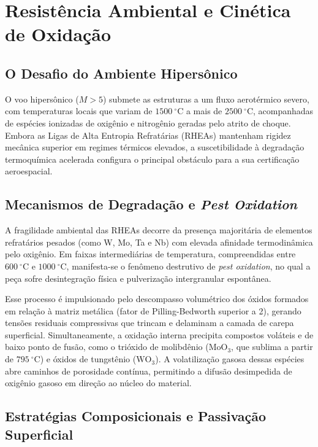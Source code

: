 \section{Resistência Ambiental e Cinética de Oxidação}\label{sec:resistencia_ambiental_oxidacao}

\subsection{O Desafio do Ambiente Hipersônico}\label{desafio-ambiente-hipersonico}

O voo hipersônico ($M > 5$) submete as estruturas a um fluxo aerotérmico severo, com temperaturas locais que variam de $1500~^\circ\mathrm{C}$ a mais de $2500~^\circ\mathrm{C}$, acompanhadas de espécies ionizadas de oxigênio e nitrogênio geradas pelo atrito de choque. Embora as Ligas de Alta Entropia Refratárias (RHEAs) mantenham rigidez mecânica superior em regimes térmicos elevados, a suscetibilidade à degradação termoquímica acelerada configura o principal obstáculo para a sua certificação aeroespacial.

\subsection{Mecanismos de Degradação e \emph{Pest Oxidation}}\label{mecanismos-degradacao-pest-oxidation}

A fragilidade ambiental das RHEAs decorre da presença majoritária de elementos refratários pesados (como W, Mo, Ta e Nb) com elevada afinidade termodinâmica pelo oxigênio. Em faixas intermediárias de temperatura, compreendidas entre $600~^\circ\mathrm{C}$ e $1000~^\circ\mathrm{C}$, manifesta-se o fenômeno destrutivo de \emph{pest oxidation}, no qual a peça sofre desintegração física e pulverização intergranular espontânea. 

Esse processo é impulsionado pelo descompasso volumétrico dos óxidos formados em relação à matriz metálica (fator de Pilling-Bedworth superior a 2), gerando tensões residuais compressivas que trincam e delaminam a camada de carepa superficial. Simultaneamente, a oxidação interna precipita compostos voláteis e de baixo ponto de fusão, como o trióxido de molibdênio ($\mathrm{MoO}_3$, que sublima a partir de $795~^\circ\mathrm{C}$) e óxidos de tungstênio ($\mathrm{WO}_3$). A volatilização gasosa dessas espécies abre caminhos de porosidade contínua, permitindo a difusão desimpedida de oxigênio gasoso em direção ao núcleo do material.

\subsection{Estratégias Composicionais e Passivação Superficial}\label{estrategias-composicionais-passivacao}

